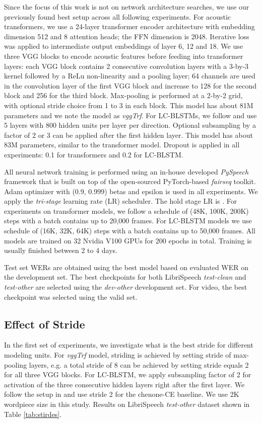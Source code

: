 \documentclass[a4paper]{article}
\begin{document}
Since the focus of this work is not on network architecture searches, we use our previously found best setup across all following experiments. For acoustic transformers, we use a 24-layer transformer encoder architecture with embedding dimension 512 and 8 attention heads; the FFN dimension is 2048. Iterative loss was applied to intermediate output embeddings of layer 6, 12 and 18. We use three VGG blocks \cite{simonyan2014very} to encode acoustic features before feeding into transformer layers: each VGG block contains 2 consecutive convolution layers with a 3-by-3 kernel followed by a ReLu non-linearity and a pooling layer; 64 channels are used in the convolution layer of the first VGG block and increase to 128 for the second block and 256 for the third block. Max-pooling is performed at a 2-by-2 grid, with optional stride choice from 1 to 3 in each block. This model has about 81M parameters and we note the model as \emph{vggTrf}. For LC-BLSTMs, we follow \cite{le2019senones} and use 5 layers with 800 hidden units per layer per direction. Optional subsampling by a factor of 2 or 3 can be applied after the first hidden layer. This model has about 83M parameters, similar to the transformer model. Dropout is applied in all experiments: 0.1 for transformers and 0.2 for LC-BLSTM. 

All neural network training is performed using an in-house developed \emph{PySpeech} framework that is built on top of the open-sourced PyTorch-based \emph{fairseq}\cite{ott2019fairseq} toolkit. Adam optimizer \cite{kingma2014adam} with (0.9, 0.999) betas and  epsilon is used in all experiments. We apply the \emph{tri-stage}\cite{park2019specaugment} learning rate (LR) scheduler. The hold stage LR is . For experiments on transformer models, we follow a schedule of (48K, 100K, 200K) steps with a batch contains up to 20,000 frames. For LC-BLSTM models we use schedule of (16K, 32K, 64K) steps with a batch contains up to 50,000 frames. All models are trained on 32 Nvidia V100 GPUs for 200 epochs in total. Training is usually finished between 2 to 4 days. 

Test set WERs are obtained using the best model based on evaluated WER on the development set. The best checkpoints for both LibriSpeech \emph{test-clean} and \emph{test-other} are selected using the \emph{dev-other} development set. For video, the best checkpoint was selected using the valid set.

\subsection{Effect of Stride}
\label{ssec:stride}
In the first set of experiments, we investigate what is the best stride for different modeling units. For \emph{vggTrf} model, striding is achieved by setting stride of max-pooling layers, e.g. a total stride of 8 can be achieved by setting stride equals 2 for all three VGG blocks. For LC-BLSTM, we apply subsampling factor of 2 for activation of the three consecutive hidden layers right after the first layer. We follow the setup in \cite{le2019senones} and use stride 2 for the chenone-CE baseline. We use 2K wordpiece size in this study. Results on LibriSpeech \emph{test-other} dataset shown in Table \ref{tab:stirdes}.
\end{document}
